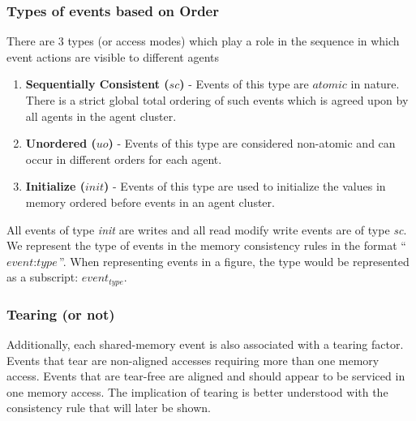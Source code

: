     \subsubsection{Types of events based on Order} 
        There are 3 types (or access modes) which play a role in the sequence in which event actions are visible to different agents
        \begin{enumerate}
            \item \textbf{Sequentially Consistent ($sc$)} - Events of this type are $atomic$ in nature. There is a strict global total ordering of such events which is agreed upon by all agents in the agent cluster. 
            
            \item \textbf{Unordered ($uo$)} - Events of this type are considered non-atomic and can occur in different orders for each agent.
            
            \item \textbf{Initialize ($init$)} - Events of this type are used to initialize the values in memory ordered before events in an agent cluster.
        \end{enumerate}
        
        All events of type \textit{init} are writes and all read modify write events are of type \textit{sc}.
        We represent the type of events in the memory consistency rules in the format ``$\textit{event} : \textit{type}$''. 
        When representing events in a figure, the type would be represented as a subscript: $\textit{event}_\textit{type}$.
   
    \subsubsection{Tearing (or not)}
        Additionally, each shared-memory event is also associated with a tearing factor. 
        Events that tear are non-aligned accesses requiring more than one memory access. Events that are tear-free are aligned and should appear to be serviced in one memory access. The implication of tearing is better understood with the consistency rule that will later be shown.